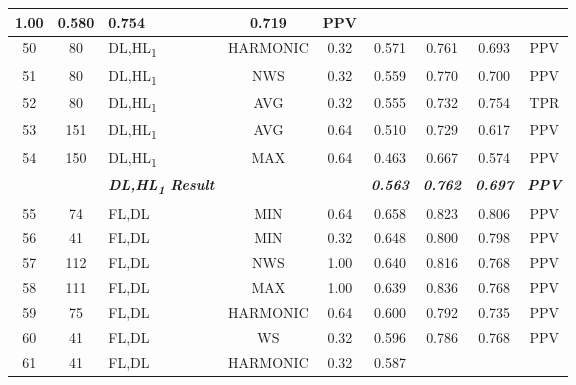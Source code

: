 \begin{table}[H]
{\begin{tabular}{cc|l|cc|c|c|c|c|}
    1.00 &
    0.580 &
    0.754 &
    0.719 &
    PPV \\ \hline
  \multicolumn{1}{|c|}{50} &
    80 &
    DL,HL\textsubscript{1} &
    \multicolumn{1}{c|}{HARMONIC} &
    0.32 &
    0.571 &
    0.761 &
    0.693 &
    PPV \\ \hline
  \multicolumn{1}{|c|}{51} &
    80 &
    DL,HL\textsubscript{1} &
    \multicolumn{1}{c|}{NWS} &
    0.32 &
    0.559 &
    0.770 &
    0.700 &
    PPV \\ \hline
  \multicolumn{1}{|c|}{52} &
    80 &
    DL,HL\textsubscript{1} &
    \multicolumn{1}{c|}{AVG} &
    0.32 &
    0.555 &
    0.732 &
    0.754 &
    TPR \\ \hline
  \multicolumn{1}{|c|}{53} &
    151 &
    DL,HL\textsubscript{1} &
    \multicolumn{1}{c|}{AVG} &
    0.64 &
    0.510 &
    0.729 &
    0.617 &
    PPV \\ \hline
  \multicolumn{1}{|c|}{54} &
    150 &
    DL,HL\textsubscript{1} &
    \multicolumn{1}{c|}{MAX} &
    0.64 &
    0.463 &
    0.667 &
    0.574 &
    PPV \\ \hline
   &
     &
    \textit{\textbf{DL,HL\textsubscript{1} Result}} &
     &
     &
    \textit{\textbf{0.563}} &
    \textit{\textbf{0.762}} &
    \textit{\textbf{0.697}} &
    \textit{\textbf{PPV}} \\ \hline
  \multicolumn{1}{|c|}{55} &
    74 &
    FL,DL &
    \multicolumn{1}{c|}{MIN} &
    0.64 &
    0.658 &
    0.823 &
    0.806 &
    PPV \\ \hline
  \multicolumn{1}{|c|}{56} &
    41 &
    FL,DL &
    \multicolumn{1}{c|}{MIN} &
    0.32 &
    0.648 &
    0.800 &
    0.798 &
    PPV \\ \hline
  \multicolumn{1}{|c|}{57} &
    112 &
    FL,DL &
    \multicolumn{1}{c|}{NWS} &
    1.00 &
    0.640 &
    0.816 &
    0.768 &
    PPV \\ \hline
  \multicolumn{1}{|c|}{58} &
    111 &
    FL,DL &
    \multicolumn{1}{c|}{MAX} &
    1.00 &
    0.639 &
    0.836 &
    0.768 &
    PPV \\ \hline
  \multicolumn{1}{|c|}{59} &
    75 &
    FL,DL &
    \multicolumn{1}{c|}{HARMONIC} &
    0.64 &
    0.600 &
    0.792 &
    0.735 &
    PPV \\ \hline
  \multicolumn{1}{|c|}{60} &
    41 &
    FL,DL &
    \multicolumn{1}{c|}{WS} &
    0.32 &
    0.596 &
    0.786 &
    0.768 &
    PPV \\ \hline
  \multicolumn{1}{|c|}{61} &
    41 &
    FL,DL &
    \multicolumn{1}{c|}{HARMONIC} &
    0.32 &
    0.587 &

\end{tabular}}
\end{table}
